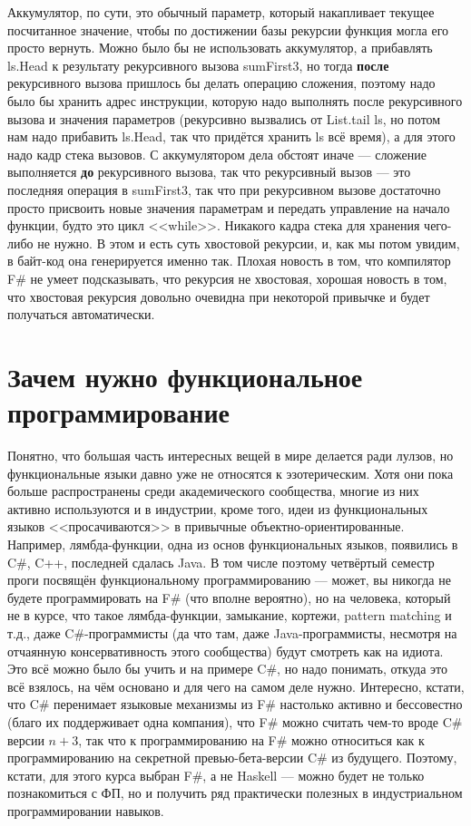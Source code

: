 \documentclass{../../text-style}
\begin{document}
Аккумулятор, по сути, это обычный параметр, который накапливает текущее посчитанное значение, чтобы по достижении базы рекурсии функция могла его просто вернуть. Можно было бы не использовать аккумулятор, а прибавлять ls.Head к результату рекурсивного вызова sumFirst3, но тогда \textbf{после} рекурсивного вызова пришлось бы делать операцию сложения, поэтому надо было бы хранить адрес инструкции, которую надо выполнять после рекурсивного вызова и значения параметров (рекурсивно вызвались от List.tail ls, но потом нам надо прибавить ls.Head, так что придётся хранить ls всё время), а для этого надо кадр стека вызовов. С аккумулятором дела обстоят иначе --- сложение выполняется \textbf{до} рекурсивного вызова, так что рекурсивный вызов --- это последняя операция в sumFirst3, так что при рекурсивном вызове достаточно просто присвоить новые значения параметрам и передать управление на начало функции, будто это цикл <<while>>. Никакого кадра стека для хранения чего-либо не нужно. В этом и есть суть хвостовой рекурсии, и, как мы потом увидим, в байт-код она генерируется именно так. Плохая новость в том, что компилятор F\# не умеет подсказывать, что рекурсия не хвостовая, хорошая новость в том, что хвостовая рекурсия довольно очевидна при некоторой привычке и будет получаться автоматически.

\section{Зачем нужно функциональное программирование}

Понятно, что большая часть интересных вещей в мире делается ради лулзов, но функциональные языки давно уже не относятся к эзотерическим. Хотя они пока больше распространены среди академического сообщества, многие из них активно используются и в индустрии, кроме того, идеи из функциональных языков <<просачиваются>> в привычные объектно-ориентированные. Например, лямбда-функции, одна из основ функциональных языков, появились в C\#, C++, последней сдалась Java. В том числе поэтому четвёртый семестр проги посвящён функциональному программированию --- может, вы никогда не будете программировать на F\# (что вполне вероятно), но на человека, который не в курсе, что такое лямбда-функции, замыкание, кортежи, pattern matching и т.д., даже C\#-программисты (да что там, даже Java-программисты, несмотря на отчаянную консервативность этого сообщества) будут смотреть как на идиота. Это всё можно было бы учить и на примере C\#, но надо понимать, откуда это всё взялось, на чём основано и для чего на самом деле нужно. Интересно, кстати, что C\# перенимает языковые механизмы из F\# настолько активно и бессовестно (благо их поддерживает одна компания), что F\# можно считать чем-то вроде C\# версии $n + 3$, так что к программированию на F\# можно относиться как к программированию на секретной превью-бета-версии C\# из будущего. Поэтому, кстати, для этого курса выбран F\#, а не Haskell --- можно будет не только познакомиться с ФП, но и получить ряд практически полезных в индустриальном программировании навыков.
\end{document}
